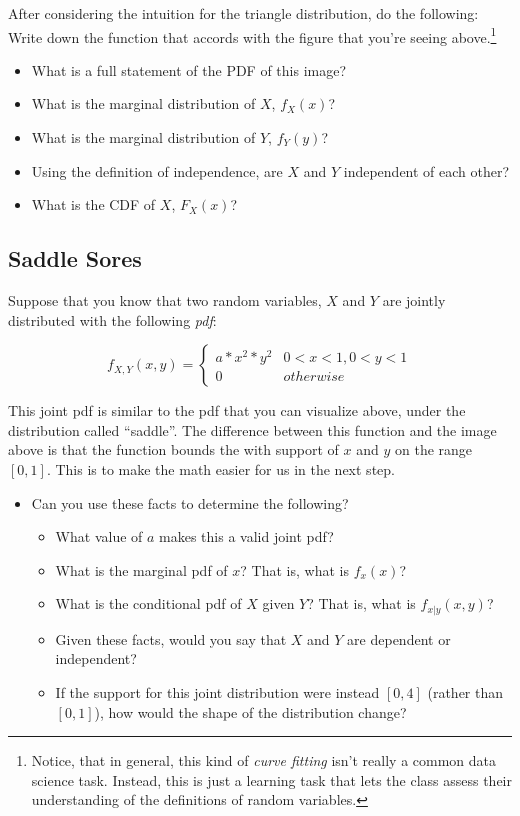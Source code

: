 \documentclass[
]{book}
\providecommand{\tightlist}{%
  \setlength{\itemsep}{0pt}\setlength{\parskip}{0pt}}
\theoremstyle{definition}
\theoremstyle{definition}
\theoremstyle{definition}
\theoremstyle{definition}
\theoremstyle{remark}
\begin{document}
After considering the intuition for the triangle distribution, do the following: Write down the function that accords with the figure that you're seeing above.\footnote{Notice, that in general, this kind of \emph{curve fitting} isn't really a common data science task. Instead, this is just a learning task that lets the class assess their understanding of the definitions of random variables.}

\begin{itemize}
\tightlist
\item
  What is a full statement of the PDF of this image?
\item
  What is the marginal distribution of \(X\), \(f_{X}(x)\)?
\item
  What is the marginal distribution of \(Y\), \(f_{Y}(y)\)?
\item
  Using the definition of independence, are \(X\) and \(Y\) independent of each other?
\item
  What is the CDF of \(X\), \(F_{X}(x)\)?
\end{itemize}

\hypertarget{saddle-sores}{%
\subsection{Saddle Sores}\label{saddle-sores}}

Suppose that you know that two random variables, \(X\) and \(Y\) are jointly distributed with the following \emph{pdf}:

\[
f_{X,Y}(x,y) = 
  \begin{cases}
    a * x^{2} * y^{2} & 0 < x < 1, 0 < y < 1 \\
    0 & otherwise
  \end{cases}
\]

This joint pdf is similar to the pdf that you can visualize above, under the distribution called ``saddle''. The difference between this function and the image above is that the function bounds the with support of \(x\) and \(y\) on the range \([0,1]\). This is to make the math easier for us in the next step.

\begin{itemize}
\tightlist
\item
  Can you use these facts to determine the following?

  \begin{itemize}
  \tightlist
  \item
    What value of \(a\) makes this a valid joint pdf?
  \item
    What is the marginal pdf of \(x\)? That is, what is \(f_{x}(x)\)?
  \item
    What is the conditional pdf of \(X\) given \(Y\)? That is, what is \(f_{x|y}(x,y)\)?
  \item
    Given these facts, would you say that \(X\) and \(Y\) are dependent or independent?
  \item
    If the support for this joint distribution were instead \([0,4]\) (rather than \([0,1]\)), how would the shape of the distribution change?
  \end{itemize}
\end{itemize}
\end{document}
